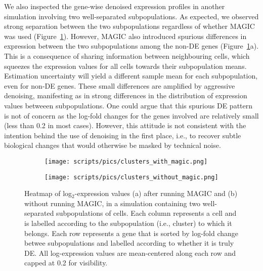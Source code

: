 \documentclass[10pt,letterpaper]{article}
\begin{document}
We also inspected the gene-wise denoised expression profiles in another simulation involving two well-separated subpopulations.
As expected, we observed strong separation between the two subpopulations regardless of whether MAGIC was used (Figure~\ref{fig:twoclusters}).
However, MAGIC also introduced spurious differences in expression between the two subpopulations among the non-DE genes (Figure~\ref{fig:twoclusters}a).
This is a consequence of sharing information between neighbouring cells, which squeezes the expression values for all cells towards their subpopulation means.
Estimation uncertainty will yield a different sample mean for each subpopulation, even for non-DE genes.
These small differences are amplified by aggressive denoising, manifesting as in strong differences in the distribution of expression values betweeen subpopulations.
One could argue that this spurious DE pattern is not of concern as the log-fold changes for the genes involved are relatively small (less than 0.2 in most cases).
However, this attitude is not consistent with the intention behind the use of denoising in the first place, 
i.e., to recover subtle biological changes that would otherwise be masked by technical noise.

\begin{figure}[btp]
\centering
\begin{subfigure}[b]{0.49\textwidth}
    \texttt{[image: scripts/pics/clusters\_with\_magic.png]}
    \caption{}
\end{subfigure}
\begin{subfigure}[b]{0.49\textwidth}
    \texttt{[image: scripts/pics/clusters\_without\_magic.png]}
    \caption{}
\end{subfigure}
\caption{Heatmap of log$_2$-expression values (a) after running MAGIC and (b) without running MAGIC, in a simulation containing two well-separated subpopulations of cells.
Each column represents a cell and is labelled according to the subpopulation (i.e., cluster) to which it belongs.
Each row represents a gene that is sorted by log-fold change betwee subpopulations and labelled according to whether it is truly DE.
All log-expression values are mean-centered along each row and capped at 0.2 for visibility.}
\label{fig:twoclusters}
\end{figure}
\end{document}
